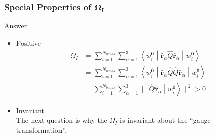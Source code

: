 \documentclass{beamer}
\begin{document}
  \begin{frame}
    \frametitle{Special Properties of \(\mathbf{\Omega_I}\)}

    \begin{block}{Answer}
      \small
      \begin{itemize}
        \item Positive 
        \begin{equation*}
          \begin{aligned}
            \Omega_I &= \sum_{i=1}^{N_{bands}}\sum_{\alpha=1}^3\left\langle{}w_i^{\mathbf{0}}\middle|\widehat{\mathbf{r}}_\alpha\widehat{Q}\widehat{\mathbf{r}}_\alpha\middle|{}w_i^\mathbf{0}\right\rangle\\
            &= \sum_{i=1}^{N_{bands}}\sum_{\alpha=1}^3\left\langle{}w_i^{\mathbf{0}}\middle|\widehat{\mathbf{r}}_\alpha\widehat{Q}\widehat{Q}\widehat{\mathbf{r}}_\alpha\middle|{}w_i^\mathbf{0}\right\rangle\\
            &= \sum_{i=1}^{N_{bands}}\sum_{\alpha=1}^3\Big\lVert\left|\widehat{Q}\widehat{\mathbf{r}}_\alpha\middle|{}w_i^\mathbf{0}\right\rangle\Big\lVert^2 > 0
          \end{aligned}
        \end{equation*} 
        \item Invariant\\
          The next question is why the \(\Omega_I\) is invariant about the ``gauge transformation''.
      \end{itemize}

    \end{block}

  \end{frame}
\end{document}
